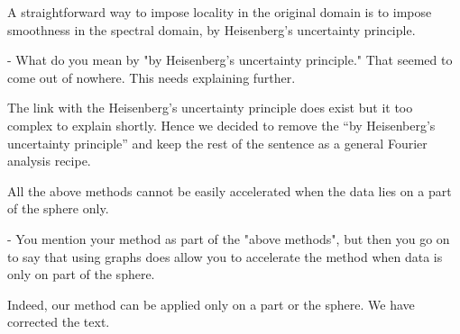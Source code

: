 \documentclass[12pt,a4paper]{article}
\newcommand{\nati}[1]{{\color[rgb]{.1,.6,.1}{NP: #1}}}
\newcommand{\todo}[1]{{\color[rgb]{.6,.1,.6}{TODO: #1}}}
\newcommand{\1}{\b{1}}              %
\newcommand{\0}{\b{0}}              %
\begin{document}
\begin{mdframed}[style=comment]
A straightforward way to impose locality in the original domain is to impose smoothness in the spectral domain, by Heisenberg’s uncertainty principle.

- What do you mean by "by Heisenberg’s uncertainty principle." That seemed to come out of nowhere. This needs explaining further.
\end{mdframed}
\todo{To check: @all}

The link with the Heisenberg's uncertainty principle does exist but it too complex to explain shortly. Hence we decided to remove the ``by Heisenberg’s uncertainty principle'' and keep the rest of the sentence as a general Fourier analysis recipe.



\begin{mdframed}[style=comment]
All the above methods cannot be easily accelerated when the data lies on a part of the sphere only.

- You mention your method as part of the "above methods", but then you go on to say that using graphs does allow you to accelerate the method when data is only on part of the sphere.
\end{mdframed}
Indeed, our method can be applied only on a part or the sphere. We have corrected the text.
\end{document}
